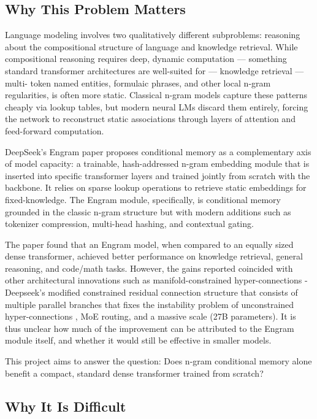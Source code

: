 \documentclass[11pt]{article}
\begin{document}
\subsection{Why This Problem Matters}

Language modeling involves two qualitatively different subproblems: reasoning about the compositional structure of language and knowledge retrieval.
While compositional reasoning requires deep, dynamic computation — something standard transformer architectures are well-suited for — knowledge retrieval — multi-
token named entities, formulaic phrases, and other local n-gram regularities, is often more static. 
Classical n-gram models capture these patterns cheaply via lookup tables, but modern neural LMs discard them
entirely, forcing the network to reconstruct static associations through layers of attention and feed-forward computation.

DeepSeek's Engram paper \cite{cheng2026engram} proposes conditional memory as a complementary axis of model capacity: 
a trainable, hash-addressed n-gram embedding module that is inserted into specific transformer layers and trained jointly from scratch with the backbone.
It relies on sparse lookup operations to retrieve static embeddings for fixed-knowledge. The Engram module, specifically, is conditional memory grounded in
the classic n-gram structure but with modern additions such as tokenizer compression, multi-head hashing, and contextual gating.

The paper found that an Engram model, when compared to an equally sized dense transformer, achieved better performance on knowledge retrieval, general reasoning, 
and code/math tasks. However, the gains reported coincided with other architectural innovations such as manifold-constrained hyper-connections - Deepseek's modified constrained residual connection structure that consists of multiple parallel branches that 
fixes the instability problem of unconstrained hyper-connections \cite{xie2026mhcmanifoldconstrainedhyperconnections}, MoE routing, 
and a massive scale (27B parameters). It is thus unclear how much of the improvement can be attributed to the Engram module itself, and whether it would still be effective in smaller models.

This project aims to answer the question: Does n-gram conditional memory alone benefit a compact, standard dense transformer trained from scratch? 

\subsection{Why It Is Difficult}
\end{document}
